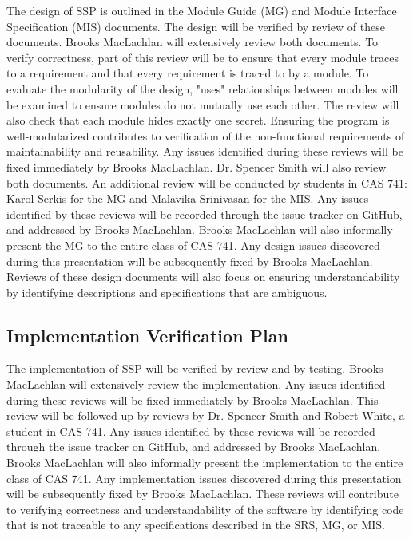 \documentclass[12pt, titlepage]{article}
\newcommand{\progname}{SSP}
\begin{document}
\noindent The design of \progname{} is outlined in the Module Guide (MG) and 
Module Interface Specification (MIS) documents. The design will be verified by 
review of these documents. Brooks MacLachlan will extensively review both 
documents. To verify correctness, part of this review will be to ensure that 
every module traces to a requirement and that every requirement is traced to by 
a module. To evaluate the modularity of the design, "uses" relationships 
between modules will be examined to ensure modules do not mutually use each 
other. The review will also check that each module hides exactly one secret. 
Ensuring the program is well-modularized contributes to verification of the 
non-functional requirements of maintainability and reusability. Any issues 
identified during these reviews will be fixed immediately by Brooks MacLachlan. 
Dr. Spencer Smith will also review both documents. An additional review will be 
conducted by students in CAS 741: Karol Serkis for the MG and Malavika 
Srinivasan for the MIS. Any issues identified by these reviews will be recorded 
through the issue tracker on GitHub, and addressed by Brooks 
MacLachlan. Brooks MacLachlan will also informally present the MG to the entire 
class of CAS 741. Any design issues discovered during this presentation will be 
subsequently fixed by Brooks MacLachlan. Reviews of these design documents will 
also focus on ensuring understandability by identifying descriptions and 
specifications that are ambiguous.

\subsection{Implementation Verification Plan} \label{sec_ImpPlan}

\noindent The implementation of \progname{} will be verified by review and by 
testing. Brooks MacLachlan will extensively review the implementation. Any 
issues identified during these reviews will be fixed immediately by Brooks 
MacLachlan. This review will be followed up by reviews by Dr. Spencer Smith and 
Robert White, a student in CAS 741. Any  issues identified by these reviews 
will be recorded through the issue tracker on GitHub, and addressed by Brooks 
MacLachlan. Brooks MacLachlan will also informally present the implementation 
to the entire class of CAS 741. Any implementation issues discovered during 
this presentation will be subsequently fixed by Brooks MacLachlan. These 
reviews will contribute to verifying correctness and understandability of the 
software by identifying code that is not traceable to any specifications 
described in the SRS, MG, or MIS.
\newline
\end{document}

